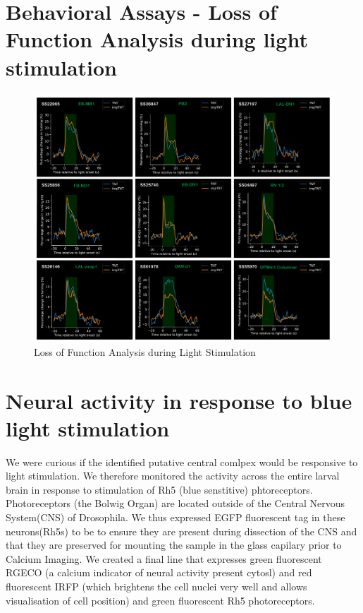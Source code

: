 \section{Behavioral Assays - Loss of Function Analysis during light stimulation}
    \begin{figure}
        \centering
        \includegraphics[width=12cm]{Figs/CX/BehaviourAssays.pdf}
        \caption[Loss of Function Analysis during Light Stimulation]{Loss of Function Analysis during Light Stimulation}
        \label{fig:label}
    \end{figure}


\section{Neural activity in response to blue light stimulation}
We were curious if the identified putative central comlpex would be responsive to light stimulation. 
We therefore monitored the activity across the entire larval brain in response to stimulation of Rh5 (blue senstitive) phtoreceptors. Photoreceptors (the Bolwig Organ) are located outside of the Central Nervous System(CNS) of Drosophila. We thus expressed  EGFP fluorescent tag in these neurons(Rh5s) to be to ensure they are present during dissection of the CNS and that they are preserved for mounting the sample in the glass capilary prior to Calcium Imaging. We created a final line that expresses green fluorescent RGECO (a calcium indicator of neural activity present cytosl) and red fluorescent IRFP (which brightens the cell nuclei very well and allows visualisation of cell position) and green fluorescent Rh5 photoreceptors. 


